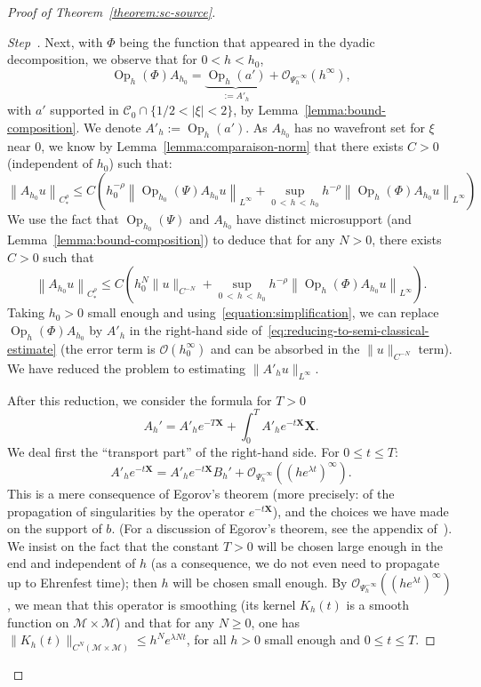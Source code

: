 \documentclass[AHL,Unicode,longabstracts,published]{cedram}
\newcommand{\X}{\mathbf{X}}
\newcommand{\mc}{\mathcal}
\newcommand{\M}{\mathcal{M}}
\newcommand{\clO}{\mathcal{O}}
\newcommand{\clC}{\mathcal{C}}
\DeclareMathOperator{\Op}{Op}
\newcounter{stepcount}
\newenvironment{step}{\refstepcounter{stepcount}\begin{proof}[Step~\thestepcount]}{\let\qed\relax\end{proof}}
\begin{document}
\begin{proof}[Proof of Theorem~\ref{theorem:sc-source}]
\begin{step}
Next, with $\Phi$ being the function that appeared in the dyadic decomposition, we observe that for $0<h<h_0$,
\begin{equation}\label{equation:simplification}
\Op_h(\Phi) A_{h_0} = \underbrace{\Op_h(a')}_{:=A'_h} + \mc{O}_{\Psi^{-\infty}_h}(h^\infty),
\end{equation}
with $a'$ supported in $\clC_0\cap \{ 1/2 < |\xi|<2\}$, by Lemma~\ref{lemma:bound-composition}. We denote $A'_h := \Op_h(a')$. As $A_{h_0}$ has no wavefront set for $\xi$ near $0$, we know by Lemma~\ref{lemma:comparaison-norm} that there exists $C > 0$ (independent of $h_0$) such that:
\begin{equation*}
\left\| A_{h_0} u \right\|_{C^\rho_\ast} \leq C \left(h_0^{-\rho} \left\|\Op_{h_0}(\Psi)A_{h_0} u \right\|_{L^\infty} + \sup_{0\,<\,h\,<\,h_0} h^{-\rho} \left\| \Op_h(\Phi) A_{h_0} u \right\|_{L^\infty}\right)
\end{equation*}
We use the fact that $\Op_{h_0}(\Psi)$ and $A_{h_0}$ have distinct microsupport (and Lemma~\ref{lemma:bound-composition}) to deduce that for any $N>0$, there exists $C>0$ such that
\begin{equation}\label{eq:reducing-to-semi-classical-estimate}
\left\| A_{h_0} u \right\|_{C^\rho_\ast} \leq C \left(h_0^N \| u \|_{C^{-N}} + \sup_{0\,<\,h\,<\,h_0} h^{-\rho} \left\| \Op_h(\Phi) A_{h_0} u \right\|_{L^\infty}\right).
\end{equation}
Taking $h_0>0$ small enough and using~\eqref{equation:simplification}, we can replace $\Op_h(\Phi) A_{h_0}$ by $A'_h$ in the right-hand side of~\eqref{eq:reducing-to-semi-classical-estimate} (the error term is $\clO(h_0^\infty)$ and can be absorbed in the $\|u\|_{C^{-N}}$ term). We have reduced the problem to estimating $\| A'_h u \|_{L^\infty}$.

After this reduction, we consider the formula for $T>0$
\begin{equation}\label{equation:ipp}
A_h' = A'_he^{-T\X} + \int_0^{T} A'_h e^{-t\X} \X.
\end{equation}
We deal first the ``transport part'' of the right-hand side. For $0 \leq t \leq T$:
\[
A'_h e^{-t \X} = A'_h e^{-t \X} B_h' + \mc{O}_{\Psi^{-\infty}_h}\left(\left(he^{\lambda t}\right)^\infty\right).
\]
This is a mere consequence of Egorov's theorem (more precisely: of the propagation of singularities by the operator $e^{-t \X}$), and the choices we have made on the support of $b$. (For a discussion of Egorov's theorem, see the appendix of~\cite[Chapter~11]{Dimassi-Sjostrand}). We insist on the fact that the constant $T > 0$ will be chosen large enough in the end and independent of $h$ (as a consequence, we do not even need to propagate up to Ehrenfest time); then $h$ will be chosen small enough. By $\mc{O}_{\Psi^{-\infty}_h}((he^{\lambda t})^\infty)$, we mean that this operator is smoothing (its kernel $K_h(t)$ is a smooth function on $\M \times \M$) and that for any $N \geq 0$, one has $\|K_h(t)\|_{C^N(\M \times \M)} \leq h^N e^{\lambda N t}$, for all $h > 0$ small enough and $0 \leq t \leq T$.


\end{step}
\end{proof}
\end{document}
